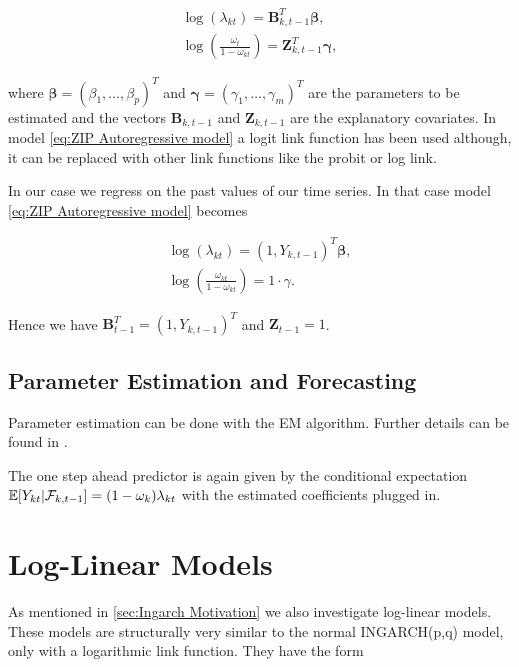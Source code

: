 \begin{gather}
\log(\lambda_{kt}) = \bm{B}^T_{k,t-1} \bm{\beta},\\
\log\left(\frac{\omega_{t}}{1-\omega_{kt}}\right)=\bm{Z}_{k,t-1}^T\bm{\gamma},
\label{eq:ZIP Autoregressive model}
\end{gather}

where $\bm{\beta} = (\beta_1,\ldots,\beta_p)^T$ and $\bm{\gamma}=(\gamma_1,\ldots,\gamma_m)^T$ are the parameters to be estimated and the vectors $\bm{B}_{k,t-1}$ and $\bm{Z}_{k,t-1}$ are the explanatory covariates. In model \ref{eq:ZIP Autoregressive model} a logit link function has been used although, it can be replaced with other link functions like the probit or log link. 

In our case we regress on the past values of our time series. In that case model \ref{eq:ZIP Autoregressive model} becomes

\begin{gather}
\log(\lambda_{kt}) = (1,Y_{k,t-1})^T \bm{\beta},\\
\log\left(\frac{\omega_{kt}}{1-\omega_{kt}}\right)= 1 \cdot \gamma.
\label{eq:ZIP Autoregressive model timeseries}
\end{gather}

Hence we have $\bm{B}^T_{t-1} = (1,Y_{k,t-1})^T$ and $\bm{Z}_{t-1} = 1$. 

\subsection{Parameter Estimation and Forecasting}
\label{sec: ZIM Parameter Estimation and Forecasting}

Parameter estimation can be done with the EM algorithm. Further details can be found in \cite{Lambert:1992}.

The one step ahead predictor is again given by the conditional expectation $\mathbb{E}[Y_{kt} | \mathcal{F}_{k,t-1}] = (1-\omega_k)\lambda_{kt} $ with the estimated coefficients plugged in. 

\section{Log-Linear Models}
\label{sec: Log-Linear Models}

As mentioned in \ref{sec:Ingarch Motivation} we also investigate log-linear models. These models are structurally very similar to the normal INGARCH(p,q) model, only with a logarithmic link function. They have the form 

